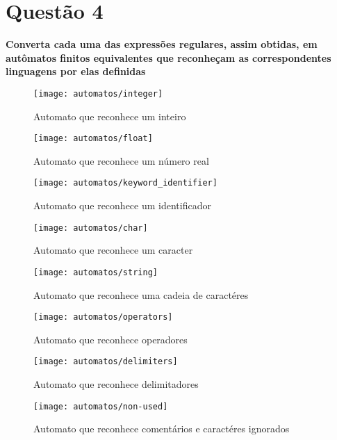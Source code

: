 \section{Questão 4}
\textbf{Converta cada uma das expressões regulares, assim obtidas, em autômatos finitos equivalentes que reconheçam as correspondentes linguagens por elas definidas}

\begin{figure}[H]
  \caption{Automato que reconhece um inteiro}
  \centering
    \texttt{[image: automatos/integer]}
\end{figure}

\begin{figure}[H]
  \caption{Automato que reconhece um número real}
  \centering
    \texttt{[image: automatos/float]}
\end{figure}

\begin{figure}[H]
  \caption{Automato que reconhece um identificador}
  \centering
    \texttt{[image: automatos/keyword\_identifier]}
\end{figure}

\begin{figure}[H]
  \caption{Automato que reconhece um caracter}
  \centering
    \texttt{[image: automatos/char]}
\end{figure}

\begin{figure}[H]
  \caption{Automato que reconhece uma cadeia de caractéres}
  \centering
    \texttt{[image: automatos/string]}
\end{figure}

\begin{figure}[H]
  \caption{Automato que reconhece operadores}
  \centering
    \texttt{[image: automatos/operators]}
\end{figure}

\begin{figure}[H]
  \caption{Automato que reconhece delimitadores}
  \centering
    \texttt{[image: automatos/delimiters]}
\end{figure}

\begin{figure}[H]
  \caption{Automato que reconhece comentários e caractéres ignorados}
  \centering
    \texttt{[image: automatos/non-used]}
\end{figure}


